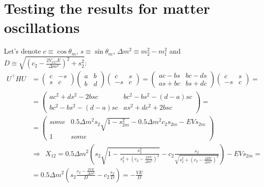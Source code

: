 \documentclass[a4paper,12pt]{article}
\begin{document}
\section{Testing the results for matter oscillations}
Let's denote $c\equiv\cos\theta_m$, $s\equiv\sin\theta_m$, $\Delta m^2\equiv m_2^2-m_1^2$ and $D\equiv \sqrt{(c_2-\frac{2V_{CC}E}{\Delta m^2})^2+s_2^2}$:
\begin{align*}
U^\top HU&=\begin{pmatrix}
c&-s\\ s&c
\end{pmatrix}\begin{pmatrix}
a&b\\ b&d
\end{pmatrix}\begin{pmatrix}
c&s\\ -s&c
\end{pmatrix}=\begin{pmatrix}
ac-bs&bc-ds\\ as+bc&bs+dc
\end{pmatrix}\begin{pmatrix}
c&s\\ -s&c
\end{pmatrix}=\\
&=\begin{pmatrix}
ac^2+ds^2-2bsc&bc^2-bs^2-(d-a)sc\\ bc^2-bs^2-(d-a)sc&as^2+dc^2+2bsc
\end{pmatrix}= \\
&=\begin{pmatrix}
some&0.5\Delta m^2s_2\sqrt{1-s_{2m}^2}-0.5\Delta m^2c_2s_{2m}-EVs_{2m} \\ 1&some
\end{pmatrix} \\
&\Rightarrow\ \ X_{12}=0.5\Delta m^2\left(s_2\sqrt{1-\frac{s_2^2}{s_2^2+(c_2-\frac{2EV}{\Delta m^2})^2}}-c_2\frac{s_2}{\sqrt{s_2^2+(c_2-\frac{2EV}{\Delta m^2})^2}}\right)-EVs_{2m}=\\
&=0.5\Delta m^2\left(s_2\frac{c_2-\frac{2VE}{\Delta m^2}}{D}-c_2\frac{s_2}{D}\right)=-\frac{VE}{D}
\end{align*}
\end{document}
